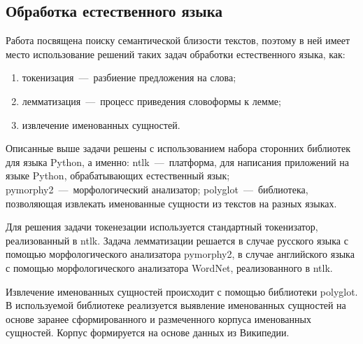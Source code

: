 \subsection{Обработка естественного языка}
\label{subsubsec:lemma}
    Работа посвящена поиску семантической близости текстов, поэтому в ней имеет место использование решений таких задач обработки естественного языка, как:
    \begin{enumerate}
        \item токенизация~---~разбиение предложения на слова;
        \item лемматизация~---~процесс приведения словоформы к лемме;
        \item извлечение именованных сущностей.
    \end{enumerate}
    Описанные выше задачи решены с использованием набора сторонних библиотек для языка Python, а именно:
    ntlk~---~платформа, для написания приложений на языке Python, обрабатывающих естественный язык;
    pymorphy2~---~морфологический анализатор;
    polyglot~---~библиотека, позволяющая извлекать именованные сущности из текстов на разных языках.

    Для решения задачи токенезации используется стандартный токенизатор, реализованный в ntlk.
    Задача лемматизации решается в случае русского языка с помощью морфологического анализатора pymorphy2,
    в случае английского языка с помощью морфологического анализатора WordNet, реализованного в ntlk.

    Извлечение именованных сущностей происходит с помощью библиотеки polyglot.
    В используемой библиотеке реализуется выявление именованных сущностей на основе заранее сформированного и размеченного корпуса именованных сущностей.
    Корпус формируется на основе данных из Википедии.

